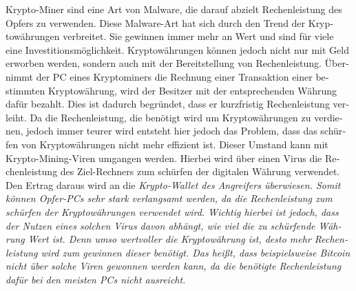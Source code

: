 \begin{otherlanguage}{ngerman}
    Krypto-Miner sind eine Art von Malware, die darauf abzielt Rechenleistung des Opfers zu verwenden. Diese Malware-Art hat sich durch den Trend der Kryptowährungen verbreitet. Sie gewinnen immer mehr an Wert und sind für viele eine Investitionsmöglichkeit. Kryptowährungen können jedoch nicht nur mit Geld erworben werden, sondern auch mit der Bereitstellung von Rechenleistung. Übernimmt der PC eines Kryptominers die Rechnung einer Transaktion einer bestimmten Kryptowährung, wird der Besitzer mit der entsprechenden Währung dafür bezahlt. Dies ist dadurch begründet, dass er kurzfristig Rechenleistung verleiht. \newline
    Da die Rechenleistung, die benötigt wird um Kryptowährungen zu verdienen, jedoch immer teurer wird entsteht hier jedoch das Problem, dass das \dq schürfen\dq{} von Kryptowährungen nicht mehr effizient ist. Dieser Umstand kann mit Krypto-Mining-Viren umgangen werden. Hierbei wird über einen Virus die Rechenleistung des Ziel-Rechners zum schürfen der digitalen Währung verwendet. Den Ertrag daraus wird an die \it Krypto-Wallet \rm des Angreifers überwiesen. Somit können Opfer-PCs sehr stark verlangsamt werden, da die Rechenleistung zum schürfen der Kryptowährungen verwendet wird. Wichtig hierbei ist jedoch, dass der Nutzen eines solchen Virus davon abhängt, wie viel die zu schürfende Währung Wert ist. Denn umso wertvoller die Kryptowährung ist, desto mehr Rechenleistung wird zum gewinnen dieser benötigt. Das heißt, dass beispielsweise Bitcoin nicht über solche Viren gewonnen werden kann, da die benötigte Rechenleistung dafür bei den meisten PCs nicht ausreicht.
\end{otherlanguage}
